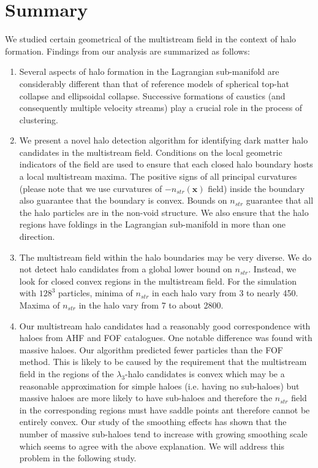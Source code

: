 \section{Summary}
\label{sec:summary}

We studied certain geometrical of the multistream field in the context of halo formation. Findings from our analysis are summarized as follows: 

\begin{enumerate}

\item Several aspects of halo formation in the Lagrangian sub-manifold are considerably different than that of reference models of spherical top-hat collapse and ellipsoidal collapse. Successive formations of caustics (and consequently multiple velocity streams) play a crucial role in the process of clustering.

\item We present a novel halo detection algorithm for identifying dark matter halo candidates in the multistream field. Conditions on the local geometric indicators of the field are used to ensure that each closed halo boundary hosts a local multistream maxima. The 
positive signs of all principal curvatures  (please note that we use curvatures of $-n_{str}(\mathbf{x})$ field) inside the boundary also guarantee that the boundary is convex. 
Bounds on $n_{str}$  guarantee that all the halo particles are in the non-void structure. We also ensure that the halo regions have foldings in the Lagrangian sub-manifold in more than one direction.  

\item The multistream field within the halo boundaries may be very diverse. We do not detect halo candidates from a global lower bound on $n_{str}$. Instead, we look for closed convex regions in the multistream field. For the simulation with $128^3$ particles, minima of $n_{str}$ in each halo vary from 3 to nearly 450. Maxima of $n_{str}$ in the halo vary from 7 to about 2800. 

\item Our multistream halo candidates had a reasonably good correspondence with haloes from AHF and FOF catalogues. One notable difference was found with massive haloes. Our algorithm predicted fewer particles than the FOF method. This is likely to be caused
by the requirement that the multistream field in the regions of the $\lambda_3$-halo candidates is convex  which may be a reasonable approximation  for simple haloes (i.e. having no sub-haloes) but massive haloes are more likely to have sub-haloes and therefore the $n_{str}$ field in the corresponding regions must have saddle points ant therefore cannot be entirely convex. Our study of the smoothing effects  has shown that the number of massive sub-haloes tend to increase with growing smoothing scale which seems to agree with the above explanation. We will address this problem in the following study.
  


\end{enumerate}

